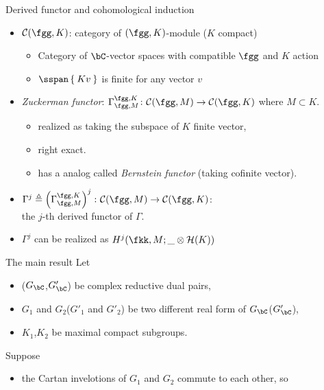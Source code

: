 \documentclass[final,hyperref={pdfpagelabels=false}]{beamer} %
\def\cC{\mathcal{C}}
\begin{document}
\begin{frame}
\begin{minipage}[t]{.48\linewidth}
\begin{block}{Derived functor and cohomological induction}
  \begin{itemize}
     \item $\cC(\fgg,K)$: category of $(\fgg, K)$-module ($K$ compact)
      \begin{itemize}
      \item Category of $\bC$-vector spaces  with compatible $\fgg$ and $K$ action
      \item $\sspan\Set{Kv}$ is finite for any vector $v$  
      \end{itemize}
    \item {\em Zuckerman functor}: $\Gamma_{\fgg,M}^{\fgg,K}
      \colon \cC(\fgg,M)\to \cC(\fgg,K)$ 
      where $M\subset K$.
      \begin{itemize}
      \item realized as taking the subspace of $K$ finite vector,
      \item right exact.
      \item has a analog called {\em Bernstein functor} (taking cofinite vector).
      \end{itemize}
    \item $\Gamma^j\triangleq\left(\Gamma_{\fgg,M}^{\fgg,K}\right)^j
      \colon \cC(\fgg,M)\to \cC(\fgg,K)$:\\
      the $j$-th derived functor of $\Gamma$.
    \item $\Gamma^j$ can be realized as $H^j(\fkk,M; \_ \otimes \mathcal{H}(K))$
    \end{itemize}
\end{block}
\vfill
\end{minipage}
\begin{minipage}[t]{.48\linewidth}
    \begin{block}{The main result}
      Let
      \begin{itemize}
      \item ($G_\bC$,$G'_\bC$) be complex reductive dual pairs,
      \item $G_1$ and $G_2$($G'_1$ and $G'_2$) 
        be two different real form of $G_\bC$($G'_\bC$),
     \item $K_1$,$K_2$ be maximal compact subgroups.
     \end{itemize}
     Suppose
     \begin{itemize}
     \item the Cartan invelotions of $G_1$ and $G_2$ commute to each other, so
        \begin{itemize}

\end{itemize}
\end{itemize}
\end{block}
\end{minipage}
\end{frame}
\end{document}
